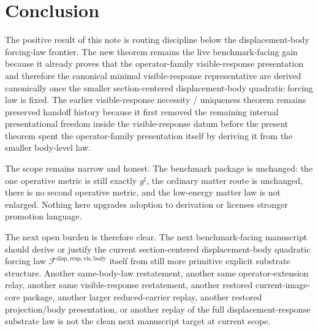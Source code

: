 \documentclass[11pt]{article}
\newcommand{\CompletedMetric}{g^{\sharp}}
\newcommand{\VisibleBodyForcingLaw}{\mathscr F^{\mathrm{disp,resp,vis,body}}}
\begin{document}
\section{Conclusion}

The positive result of this note is routing discipline below the displacement-body forcing-law frontier. The new theorem remains the live benchmark-facing gain because it already proves that the operator-family visible-response presentation and therefore the canonical minimal visible-response representative are derived canonically once the smaller section-centered displacement-body quadratic forcing law is fixed. The earlier visible-response necessity / uniqueness theorem remains preserved handoff history because it first removed the remaining internal presentational freedom inside the visible-response datum before the present theorem spent the operator-family presentation itself by deriving it from the smaller body-level law.

The scope remains narrow and honest. The benchmark package is unchanged: the one operative metric is still exactly \(\CompletedMetric\), the ordinary matter route is unchanged, there is no second operative metric, and the low-energy matter law is not enlarged. Nothing here upgrades adoption to derivation or licenses stronger promotion language.

The next open burden is therefore clear. The next benchmark-facing manuscript should derive or justify the current section-centered displacement-body quadratic forcing law \(\VisibleBodyForcingLaw\) itself from still more primitive explicit substrate structure. Another same-body-law restatement, another same operator-extension relay, another same visible-response restatement, another restored current-image-core package, another larger reduced-carrier replay, another restored projection/body presentation, or another replay of the full displacement-response substrate law is not the clean next manuscript target at current scope.
\end{document}
